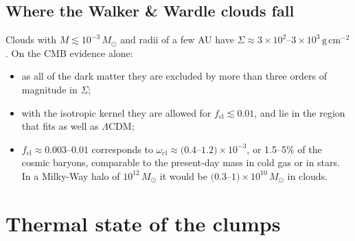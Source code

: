 \documentclass[11pt,a4paper]{article}
\newcommand{\cl}{\mathrm{cl}}
\begin{document}
\subsection{Where the Walker \& Wardle clouds fall}

Clouds with $M \lesssim 10^{-3}\,M_\odot$ and radii of a few AU \citep{WalkerWardle1998} have $\Sigma \approx 3\times10^{2}$--$3\times10^{3}\,\mathrm{g\,cm^{-2}}$. On the CMB evidence alone:
\begin{itemize}
\item as all of the dark matter they are excluded by more than three orders of magnitude in $\Sigma$;
\item with the isotropic kernel they are allowed for $f_\cl \lesssim 0.01$, and lie in the region that fits as well as $\Lambda$CDM;
\item $f_\cl \approx 0.003$--$0.01$ corresponds to $\omega_\cl \approx (0.4$--$1.2)\times10^{-3}$, or 1.5--5\% of the cosmic baryons, comparable to the present-day mass in cold gas or in stars. In a Milky-Way halo of $10^{12}\,M_\odot$ it would be $(0.3$--$1)\times10^{10}\,M_\odot$ in clouds.
\end{itemize}

\section{Thermal state of the clumps}
\label{sec:thermal}
\end{document}
